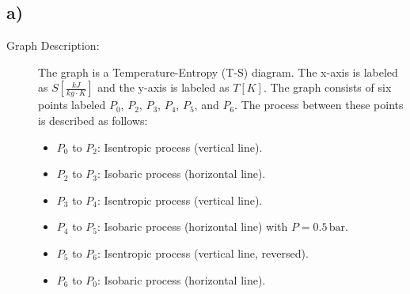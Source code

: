 

\subsection*{a)}

\begin{description}
    \item[Graph Description:] The graph is a Temperature-Entropy (T-S) diagram. The x-axis is labeled as $S \left[ \frac{kJ}{kg \cdot K} \right]$ and the y-axis is labeled as $T \left[ K \right]$. The graph consists of six points labeled $P_0$, $P_2$, $P_3$, $P_4$, $P_5$, and $P_6$. The process between these points is described as follows:
    \begin{itemize}
        \item $P_0$ to $P_2$: Isentropic process (vertical line).
        \item $P_2$ to $P_3$: Isobaric process (horizontal line).
        \item $P_3$ to $P_4$: Isentropic process (vertical line).
        \item $P_4$ to $P_5$: Isobaric process (horizontal line) with $P = 0.5 \, \text{bar}$.
        \item $P_5$ to $P_6$: Isentropic process (vertical line, reversed).
        \item $P_6$ to $P_0$: Isobaric process (horizontal line).
    \end{itemize}
\end{description}